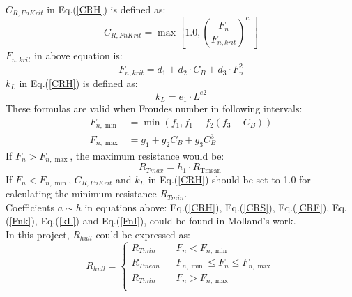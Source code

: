 \noindent $C_{R, F n K r i t}$ in Eq.(\ref{CRH}) is defined as:
\begin{equation}
    C_{R, F n K r i t}=\max \left[1.0,\left(\frac{F_{n}}{F_{n, k r i t}}\right)^{c_{1}}\right]
    \label{CRF}
\end{equation} 
$F_{n, k r i t}$ in above equation is:
\begin{equation}
    F_{n, k r i t}=d_{1}+d_{2} \cdot C_{B}+d_{3} \cdot F_{n}^{2}
    \label{Fnk}
\end{equation} 
$k_{L}$ in  Eq.(\ref{CRH}) is defined as:
\begin{equation}
    k_{L}=e_{1} \cdot L^{e 2}
    \label{kL}
\end{equation} 
These formulas are valid when Froudes number in following intervals:
\begin{equation}
    \begin{aligned}
        F_{n,\min }&=\min \left(f_{1}, f_{1}+f_{2}\left(f_{3}-C_{B}\right)\right) \\
        F_{n,\max }&=g_{1}+g_{2} C_{B}+g_{3} C_{B}^{3}
    \end{aligned}
    \label{FnI}
\end{equation}
If $F_{n}>F_{n,\max }$, the maximum resistance would be:
\begin{equation}
    R_{Tmax}=h_{1} \cdot R_{\text {Tmean }}
    \label{Rmax}
\end{equation}
If $F_{n}<F_{n,\min }$, $C_{R, F n K r i t}$ and $k_{L}$ in Eq.(\ref{CRH}) should be set to 1.0 for calculating the minimum resistance $R_{Tmin}$.
\\Coefficients $a \sim h$ in equations above: Eq.(\ref{CRH}), Eq.(\ref{CRS}), Eq.(\ref{CRF}), Eq.(\ref{Fnk}), Eq.(\ref{kL}) and Eq.(\ref{FnI}), could be found in Molland's work\cite{molland2011ship}.
\\In this project, $R_{hull}$ could be expressed as:
\begin{equation}
    R_{hull}=\left\{
        \begin{array}{rcl}
            R_{Tmin}     &      & F_{n}<F_{n,\min }\\
            R_{Tmean}  &      & F_{n,\min } \leq F_{n} \leq F_{n,\max }\\
            R_{Tmin}     &      & F_{n}>F_{n,\max }\\
        \end{array} \right.
    \label{RHullEq}
\end{equation}

